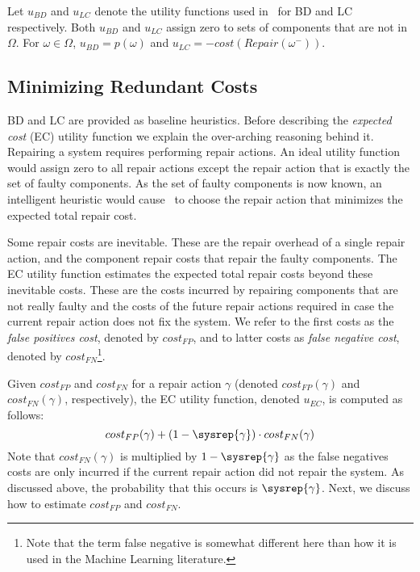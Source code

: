Let $u_{BD}$ and $u_{LC}$ denote the utility functions used in \myopic\ for BD and LC respectively. Both $u_{BD}$ and $u_{LC}$ assign zero to sets of components that are not in $\Omega$. For $\omega\in \Omega$, $u_{BD}=p(\omega)$ and $u_{LC}=-cost(Repair(\omega^{-}))$.





\subsection{Minimizing Redundant Costs}
BD and LC are provided as baseline heuristics. Before describing the {\em expected cost} (EC) utility function we explain the over-arching reasoning behind it.
Repairing a system requires performing repair actions. An ideal utility function would assign zero to all repair actions except the repair action that is exactly the set of faulty components. As the set of faulty components is now known, an intelligent heuristic would cause \myopic\ to choose the repair action that minimizes the expected total repair cost.


Some repair costs are inevitable. These are the repair overhead of a single repair action, and the component repair costs that repair the faulty components. The EC utility function estimates the expected total repair costs beyond these inevitable costs. These are the costs incurred by repairing components that are not really faulty and the costs of the future repair actions required in case the current repair action does not fix the system. We refer to the first costs as the {\em false positives cost}, denoted by $cost_{FP}$, and to latter costs as {\em false negative cost}, denoted by $cost_{FN}$\footnote{Note that the term false negative is somewhat different here than how it is used in the Machine Learning literature.}.

Given $cost_{FP}$ and $cost_{FN}$ for a repair action $\gamma$ (denoted $cost_{FP}(\gamma)$ and $cost_{FN}(\gamma)$, respectively), the EC utility function, denoted $u_{EC}$, is computed as follows:
\[ cost_{FP}(\gamma)+(1-\sysrep{\gamma})\cdot cost_{FN}(\gamma)\]
Note that $cost_{FN}(\gamma)$ is multiplied by $1-\sysrep{\gamma}$ as the false negatives costs are only incurred if the current repair action did not repair the system. As discussed above, the probability that this occurs is $\sysrep{\gamma}$. %
\noindent Next, we discuss how to estimate $cost_{FP}$ and $cost_{FN}$.


